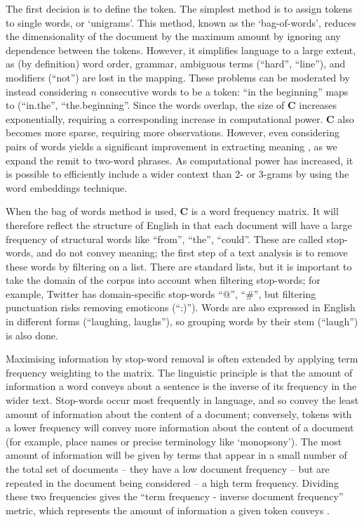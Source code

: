 \documentclass{article}
\begin{document}
The first decision is to define the token. The simplest method is to assign tokens to single words, or `unigrams'. This method, known as the `bag-of-words', reduces the dimensionality of the document by the maximum amount by ignoring any dependence between the tokens. However, it simplifies language to a large extent, as (by definition) word order, grammar, ambiguous terms (``hard'', ``line''), and modifiers (``not'') are lost in the mapping. These problems can be moderated by instead considering \(n\) consecutive words to be a token: ``in the beginning'' maps to (``in.the'', ``the.beginning''. Since the words overlap, the size of \(\mathbf{C}\) increases exponentially, requiring a corresponding increase in computational power. \(\mathbf{C}\) also becomes more sparse, requiring more observations. However, even considering pairs of words yields a significant improvement in extracting meaning \parencite{chengNgramSkipgramConcgram2006}, as we expand the remit to two-word phrases. As computational power has increased, it is possible to efficiently include a wider context than 2- or 3-grams by using the word embeddings technique.

When the bag of words method is used, \(\mathbf{C}\) is a word frequency matrix. It will therefore reflect the structure of English in that each document will have a large frequency of structural words like ``from'', ``the'', ``could''. These are called stop-words, and do not convey meaning; the first step of a text analysis is to remove these words by filtering on a list. There are standard lists, but it is important to take the domain of the corpus into account when filtering stop-words; for example, Twitter has domain-specific stop-words ``@'', ``\#'', but filtering punctuation risks removing emoticons (``:)'').  Words are also expressed in English in different forms (``laughing, laughs''), so grouping words by their stem (``laugh'') is also done.

Maximising information by stop-word removal is often extended by applying term frequency weighting to the matrix. The linguistic principle is that the amount of information a word conveys about a sentence is the inverse of its frequency in the wider text. Stop-words occur most frequently in language, and so convey the least amount of information about the content of a document; conversely, tokens with a lower frequency will convey more information about the content of a document (for example, place names or precise terminology like `monopsony'). The most amount of information will be given by terms that appear in a small number of the total set of documents -- they have a low document frequency -- but are repeated in the document being considered -- a high term frequency. Dividing these two frequencies gives the ``term frequency - inverse document frequency'' metric, which represents the amount of information a given token conveys \parencite[100]{manningIntroductionInformationRetrieval2008}.
\end{document}
